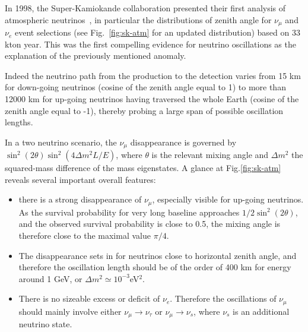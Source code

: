\documentclass[preprint,12pt]{elsarticle}
\begin{document}
In 1998, the Super-Kamiokande collaboration presented their first analysis of atmospheric neutrinos~\cite{ref:skatm98}, in particular the distributions of zenith angle for $ \nu_\mu$ and $\nu_e$ event selections (see Fig.~\ref{fig:sk-atm} for an updated distribution) based on 33 kton year. This was the first compelling evidence for neutrino oscillations as the explanation of the previously mentioned anomaly.  

Indeed the neutrino path from the production to the detection varies from 15 km for down-going neutrinos (cosine of the zenith angle equal to 1) to more than 12000 km for up-going neutrinos having traversed the whole Earth (cosine of the zenith angle equal to -1), thereby probing a large span of possible oscillation lengths. 

In a two neutrino scenario, the $\nu_\mu$ disappearance is governed by $\sin^2 (2 \theta) \sin^2 (4 \Delta m^2 L /E)$, where $\theta$ is the relevant mixing angle and $\Delta m^2$ the squared-mass difference of the mass eigenstates. A glance at Fig.\ref{fig:sk-atm} reveals several important overall features: 
\begin{itemize}
\item there is a strong disappearance of $\nu_\mu$, especially visible for up-going neutrinos. As the survival probability for very long baseline approaches $1/2 \sin^2 (2 \theta)$, and the observed survival probability is close to 0.5, the mixing angle is therefore close to the maximal value $\pi/4$. 
\item The disappearance sets in for neutrinos close to horizontal zenith angle, and therefore the oscillation length should be of the order of 400 km for energy around 1 GeV, or $\Delta m^2 \simeq 10^{-3}$eV$^2$.  
\item There is no sizeable excess or deficit of $\nu_e$. Therefore the oscillations of $\nu_{\mu}$ should mainly involve either $\nu_{\mu} \rightarrow \nu_{\tau}$ or $\nu_{\mu} \rightarrow \nu_s$, where $\nu_s$ is an additional neutrino state.
\end{itemize}
\end{document}
